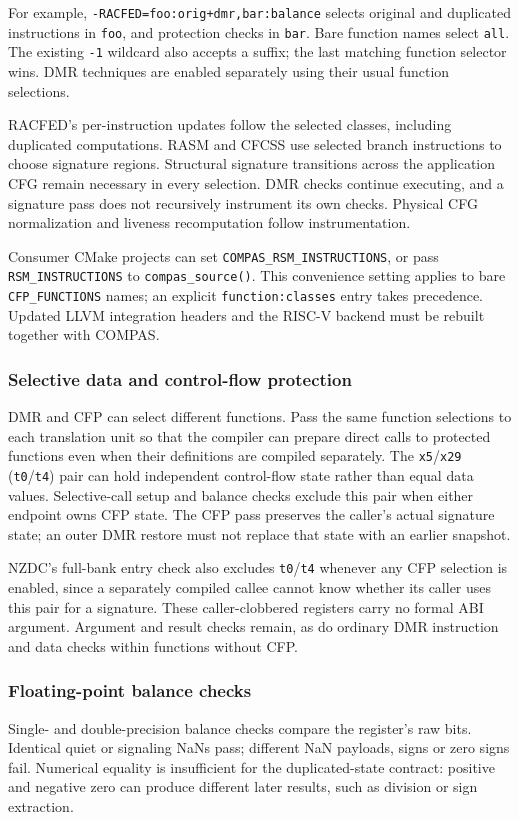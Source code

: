 For example, \texttt{-RACFED=foo:orig+dmr,bar:balance} selects original and
duplicated instructions in \texttt{foo}, and protection checks in \texttt{bar}.
Bare function names select \texttt{all}. The existing \texttt{-1} wildcard
also accepts a suffix; the last matching function selector wins.
DMR techniques are enabled separately using their usual function selections.

RACFED's per-instruction updates follow the selected classes, including
duplicated computations. RASM and CFCSS use selected branch instructions to
choose signature regions. Structural signature transitions across the
application CFG remain necessary in every selection. DMR checks continue
executing, and a signature pass does not recursively instrument its own checks.
Physical CFG normalization and liveness recomputation follow instrumentation.

Consumer CMake projects can set \texttt{COMPAS\_RSM\_INSTRUCTIONS}, or pass
\texttt{RSM\_INSTRUCTIONS} to \texttt{compas\_source()}. This convenience
setting applies to bare \texttt{CFP\_FUNCTIONS} names; an explicit
\texttt{function:classes} entry takes precedence. Updated LLVM integration
headers and the RISC-V backend must be rebuilt together with COMPAS.

\subsubsection{Selective data and control-flow protection}
DMR and CFP can select different functions. Pass the same function selections
to each translation unit so that the compiler can prepare direct calls to
protected functions even when their definitions are compiled separately.
The \texttt{x5}/\texttt{x29} (\texttt{t0}/\texttt{t4}) pair can hold
independent control-flow state rather than equal data values. Selective-call
setup and balance checks exclude this pair when either endpoint owns CFP state.
The CFP pass preserves the caller's actual signature state; an outer DMR
restore must not replace that state with an earlier snapshot.

NZDC's full-bank entry check also excludes \texttt{t0}/\texttt{t4} whenever
any CFP selection is enabled, since a separately compiled callee cannot know
whether its caller uses this pair for a signature. These caller-clobbered
registers carry no formal ABI argument. Argument and result checks remain,
as do ordinary DMR instruction and data checks within functions without CFP.

\subsubsection{Floating-point balance checks}
Single- and double-precision balance checks compare the register's raw bits.
Identical quiet or signaling NaNs pass; different NaN payloads, signs or zero
signs fail. Numerical equality is insufficient for the duplicated-state
contract: positive and negative zero can produce different later results,
such as division or sign extraction.

